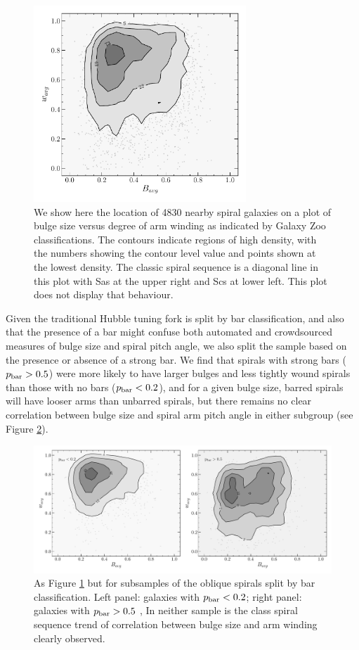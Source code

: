 \documentclass[usenatbib]{mn2e}
\begin{document}
 \begin{figure}
\includegraphics[width=80mm]{bulge_armwinding.pdf}
\caption{We show here the location of {4830} nearby spiral galaxies on a plot of bulge size versus degree of arm winding as indicated by Galaxy Zoo classifications. The contours indicate regions of high density, with the numbers showing the contour level value and points shown at the lowest density.  The classic spiral sequence is a diagonal line in this plot with Sas at the upper right and Scs at lower left. This plot does not display that behaviour.  \label{bulgewinding}}
\end{figure}
 
 Given the traditional Hubble tuning fork is split by bar classification, and also that the presence of a bar might confuse both automated and crowdsourced measures of bulge size and spiral pitch angle, we also split the sample based on the presence or absence of a strong bar. We find that spirals with strong bars ($p_{\rm bar}>0.5$)  were more likely to have larger bulges and less tightly wound spirals than those with no bars ($p_{\rm bar} < 0.2$), and for a given bulge size, barred spirals will have looser arms than unbarred spirals, but there remains no clear correlation between bulge size and spiral arm pitch angle in either subgroup (see Figure \ref{bars}). 
  
 \begin{figure}
\includegraphics[width=160mm]{bulge_armwinding_split_bar.pdf}
\caption{As Figure \ref{bulgewinding} but for subsamples of the oblique spirals split by bar classification.  Left panel: galaxies with $p_{\rm bar} < 0.2$; right panel: galaxies with $p_{\rm bar} > 0.5$ \label{bars}, In neither sample is the class spiral sequence trend of correlation between bulge size and arm winding clearly observed. }
\end{figure}
\end{document}
